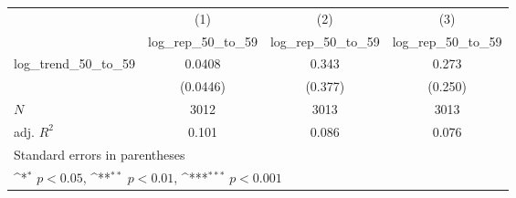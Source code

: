 {
\def\sym#1{\ifmmode^{#1}\else\(^{#1}\)\fi}
\begin{tabular}{l*{3}{c}}
\hline\hline
            &\multicolumn{1}{c}{(1)}&\multicolumn{1}{c}{(2)}&\multicolumn{1}{c}{(3)}\\
            &\multicolumn{1}{c}{log\_rep\_50\_to\_59}&\multicolumn{1}{c}{log\_rep\_50\_to\_59}&\multicolumn{1}{c}{log\_rep\_50\_to\_59}\\
\hline
log\_trend\_50\_to\_59&      0.0408         &       0.343         &       0.273         \\
            &    (0.0446)         &     (0.377)         &     (0.250)         \\
\hline
\(N\)       &        3012         &        3013         &        3013         \\
adj. \(R^{2}\)&       0.101         &       0.086         &       0.076         \\
\hline\hline
\multicolumn{4}{l}{\footnotesize Standard errors in parentheses}\\
\multicolumn{4}{l}{\footnotesize \sym{*} \(p<0.05\), \sym{**} \(p<0.01\), \sym{***} \(p<0.001\)}\\
\end{tabular}
}
